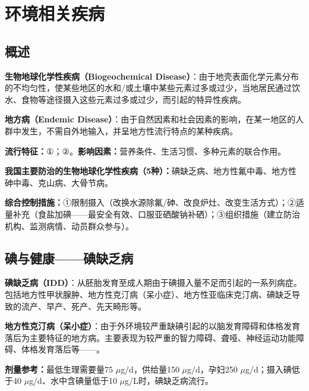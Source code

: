\chapter{环境相关疾病}
\setcounter{chapter}{8}

\section{概述}

\begin{defbox}
\textbf{生物地球化学性疾病（Biogeochemical Disease）}：由于地壳表面化学元素分布的不均匀性，使某些地区的水和/或土壤中某些元素过多或过少，当地居民通过饮水、食物等途径摄入这些元素过多或过少，而引起的特异性疾病。

\textbf{地方病（Endemic Disease）}：由于自然因素和社会因素的影响，在某一地区的人群中发生，不需自外地输入，并呈地方性流行特点的某种疾病。
\end{defbox}

\textbf{流行特征：}①；②。\textbf{影响因素：}营养条件、生活习惯、多种元素的联合作用。

\textbf{我国主要防治的生物地球化学性疾病（5种）：}碘缺乏病、地方性氟中毒、地方性砷中毒、克山病、大骨节病。

\textbf{综合控制措施：}①限制摄入（改换水源除氟/砷、改良炉灶、改变生活方式）；②适量补充（食盐加碘——最安全有效、口服亚硒酸钠补硒）；③组织措施（建立防治机构、监测病情、动员群众参与）。

\section{碘与健康——碘缺乏病}

\begin{defbox}
\textbf{碘缺乏病（IDD）}：从胚胎发育至成人期由于碘摄入量不足而引起的一系列病症。包括地方性甲状腺肿、地方性克汀病（呆小症）、地方性亚临床克汀病、碘缺乏导致的流产、早产、死产、先天畸形等。

\textbf{地方性克汀病（呆小症）}：由于外环境较严重缺碘引起的以脑发育障碍和体格发育落后为主要特征的地方病。主要表现为较严重的智力障碍、聋哑、神经运动功能障碍、体格发育落后等——。

\textbf{剂量参考：}最低生理需要量75 $\mu$g/d，供给量150 $\mu$g/d，孕妇250 $\mu$g/d；摄入碘低于40 $\mu$g/d、水中含碘量低于10 $\mu$g/L时，碘缺乏病流行。
\end{defbox}


